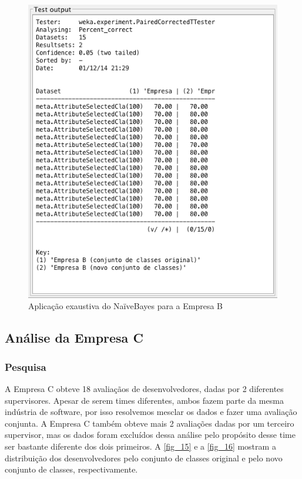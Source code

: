 \begin{figure}[p]
	\centering
	\includegraphics[width=\textwidth]{figs/empresa_b/exaustive-naivebayes.png}
	\caption{\label{fig_14}Aplicação exaustiva do NaïveBayes para a Empresa B}
\end{figure}
\clearpage


\subsection{Análise da Empresa C}

\subsubsection{Pesquisa}

A Empresa C obteve 18 avaliaçãos de desenvolvedores, dadas por 2 diferentes supervisores. Apesar de serem times diferentes, ambos fazem parte da mesma indústria de software, por isso resolvemos mesclar os dados e fazer uma avaliação conjunta. A Empresa C também obteve mais 2 avaliações dadas por um terceiro supervisor, mas os dados foram excluídos dessa análise pelo propósito desse time ser bastante diferente dos dois primeiros. A \autoref{fig_15} e a \autoref{fig_16} mostram a distribuição dos desenvolvedores pelo conjunto de classes original e pelo novo conjunto de classes, respectivamente. 

